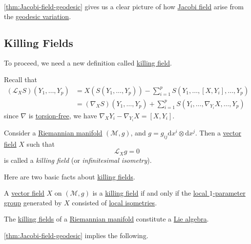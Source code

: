 \autoref{thm:Jacobi-field-geodesic} gives us a clear picture of how \hyperref[def:Jacobi-field]{Jacobi field} arise from the \hyperref[def:geodesic-variation]{geodesic variation}.

\subsection{Killing Fields}
To proceed, we need a new definition called \hyperref[def:killing-field]{killing field}.

\begin{prev}
	Recall that
	\[
		\begin{split}
			(\mathcal{L} _X S) (Y_1, \dots , Y_p)
			&=X(S(Y_1, \dots , Y_p))
			- \sum_{i=1}^{p} S(Y_1, \dots , [X, Y_i], \dots , Y_p)\\
			&= (\nabla _X S)(Y_1, \dots , Y_p) + \sum_{i=1}^{p} S(Y_i, \dots , \nabla _{Y_i}X, \dots , Y_p)
		\end{split}
	\]
	since \(\nabla \) is \hyperref[def:torsion-free]{torsion-free}, we have \(\nabla _X Y_i - \nabla _{Y_i}X = [X, Y_i]\).
\end{prev}

\begin{definition}\label{def:killing-field}
	Consider a \hyperref[def:Riemannian-manifold]{Riemannian manifold} \((\mathcal{M} , g)\), and \(g = g_{ij} \mathrm{d} x^i \otimes \mathrm{d} x^j \). Then a \hyperref[def:vector-field]{vector field} \(X\) such that
	\[
		\mathcal{L} _X g = 0
	\]
	is called a \emph{killing field} (or \emph{infinitesimal isometry}).
\end{definition}

Here are two basic facts about \hyperref[def:killing-field]{killing fields}.

\begin{lemma}
	A \hyperref[def:vector-field]{vector field} \(X\) on \((\mathcal{M} , g)\) is a \hyperref[def:killing-field]{killing field} if and only if the \hyperref[def:local-1-parameter-group]{local \(1\)-parameter group} generated by \(X\) consisted of \hyperref[def:local-isometry]{local isometries}.
\end{lemma}

\begin{lemma}
	The \hyperref[def:killing-field]{killing fields} of a \hyperref[def:Riemannian-manifold]{Riemannian manifold} constitute a \hyperref[def:Lie-algebra]{Lie algebra}.
\end{lemma}

\autoref{thm:Jacobi-field-geodesic} implies the following.

